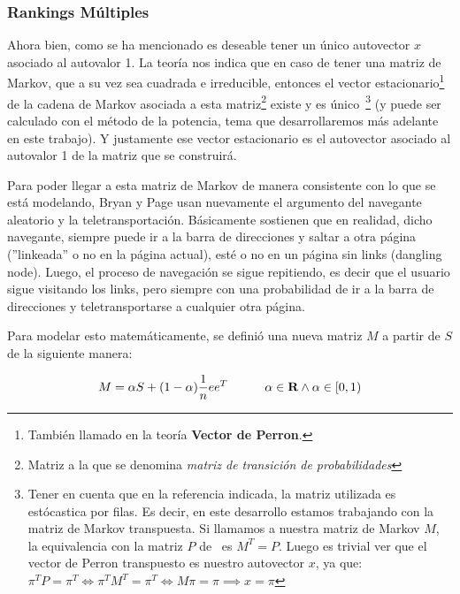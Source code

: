 \subsubsection*{Rankings M\'ultiples}\label{subsubsec:mult_ranks}
\par Ahora bien, como se ha mencionado es deseable tener un \'unico autovector
$x$ asociado al autovalor 1. La teor\'ia nos indica que en caso de tener una
matriz de Markov, que a su vez sea cuadrada e irreducible, entonces el vector
estacionario\footnote{Tambi\'en llamado en la teor\'ia \textbf{Vector de
Perron}.} de la cadena de Markov asociada a esta matriz\footnote{Matriz a la que
se denomina \emph{matriz de transici\'on de probabilidades}} existe y es
\'unico~\cite[p.693]{Meyer2000}\footnote{Tener en cuenta que en la referencia
indicada, la matriz utilizada es est\'ocastica por filas. Es decir, en este
desarrollo estamos trabajando con la matriz de Markov transpuesta. Si llamamos a
nuestra matriz de Markov $M$, la equivalencia con la matriz $P$
de~\cite[p.693]{Meyer2000} es $M^T = P$. Luego es trivial ver que el vector de
Perron transpuesto es nuestro autovector $x$, ya que: $\pi^TP =\pi^T \iff
\pi^TM^T=\pi^T \iff M\pi=\pi \implies x=\pi$} (y puede ser calculado con el
m\'etodo de la potencia, tema que desarrollaremos m\'as adelante en este
trabajo). Y justamente ese vector estacionario es el autovector asociado al
autovalor 1 de la matriz que se construir\'a.

\par Para poder llegar a esta matriz de Markov de manera consistente con lo
que se est\'a modelando, Bryan y Page usan nuevamente el argumento del navegante
aleatorio y la teletransportaci\'on.  B\'asicamente sostienen que en realidad,
dicho navegante, siempre puede ir a la barra de direcciones y saltar a otra
p\'agina (''linkeada'' o no en la p\'agina actual), est\'e o no en un p\'agina
sin links (dangling node). Luego, el proceso de navegaci\'on se sigue
repitiendo, es decir que el usuario sigue visitando los links, pero siempre con
una probabilidad de ir a la barra de direcciones y teletransportarse a cualquier
otra p\'agina.

\par Para modelar esto matem\'aticamente, se defini\'o una nueva matriz
$M$ a partir de $S$ de la siguiente manera:

\begin{equation}
    M = \alpha S + (1-\alpha) \frac{1}{n}ee^T \quad\quad\quad \alpha\in\real
    \land \alpha\in\left[0,1\right) \label{eq:M_def}
\end{equation}

